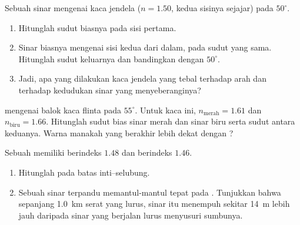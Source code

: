 \begin{exercise}[$\star\star$]\label{exo:g10:refraction:9}
Sebuah sinar mengenai kaca jendela ($n = 1.50$, kedua sisinya sejajar)
pada $50^\circ$.
\begin{enumerate}
  \item Hitunglah sudut biasnya pada sisi pertama.
  \item Sinar biasnya mengenai sisi kedua dari dalam, pada sudut yang
        sama. Hitunglah sudut keluarnya dan bandingkan dengan
        $50^\circ$.
  \item Jadi, apa yang dilakukan kaca jendela yang tebal terhadap arah
        dan terhadap kedudukan sinar yang menyeberanginya?
\end{enumerate}
\end{exercise}

\begin{exercise}[$\star\star$]\label{exo:g10:refraction:10}
 mengenai balok kaca flinta pada $55^\circ$. Untuk kaca ini,
$n_{\text{merah}} = 1.61$ dan $n_{\text{biru}} = 1.66$. Hitunglah sudut
bias sinar merah dan sinar biru serta sudut antara keduanya. Warna
manakah yang berakhir lebih dekat dengan ?
\end{exercise}

\begin{exercise}[$\star\star$]\label{exo:g10:refraction:11}
Sebuah  memiliki  berindeks $1.48$ dan 
berindeks $1.46$.
\begin{enumerate}
  \item Hitunglah  pada batas inti--selubung.
  \item Sebuah sinar terpandu memantul-mantul tepat pada .
        Tunjukkan bahwa sepanjang \qty{1.0}{km} serat yang lurus, sinar
        itu menempuh sekitar \qty{14}{m} lebih jauh daripada sinar yang
        berjalan lurus menyusuri sumbunya.
\end{enumerate}
\end{exercise}

